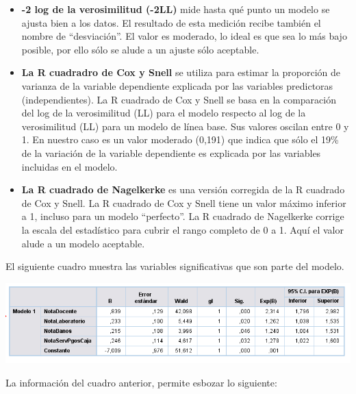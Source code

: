 \documentclass[]{book}
\begin{document}
\begin{itemize}
\item
  \textbf{-2 log de la verosimilitud (-2LL)} mide hasta qué punto un
  modelo se ajusta bien a los datos. El resultado de esta medición
  recibe también el nombre de ``desviación''. El valor es moderado, lo
  ideal es que sea lo más bajo posible, por ello sólo se alude a un
  ajuste sólo aceptable.
\item
  \textbf{La R cuadradro de Cox y Snell} se utiliza para estimar la
  proporción de varianza de la variable dependiente explicada por las
  variables predictoras (independientes). La R cuadrado de Cox y Snell
  se basa en la comparación del log de la verosimilitud (LL) para el
  modelo respecto al log de la verosimilitud (LL) para un modelo de
  línea base. Sus valores oscilan entre 0 y 1. En nuestro caso es un
  valor moderado (0,191) que indica que sólo el 19\% de la variación de
  la variable dependiente es explicada por las variables incluidas en el
  modelo.
\item
  \textbf{La R cuadrado de Nagelkerke} es una versión corregida de la R
  cuadrado de Cox y Snell. La R cuadrado de Cox y Snell tiene un valor
  máximo inferior a 1, incluso para un modelo ``perfecto''. La R
  cuadrado de Nagelkerke corrige la escala del estadístico para cubrir
  el rango completo de 0 a 1. Aquí el valor alude a un modelo aceptable.
\end{itemize}

El siguiente cuadro muestra las variables significativas que son parte
del modelo.

\begin{center}\includegraphics{images/Modelo1} \end{center}

La información del cuadro anterior, permite esbozar lo siguiente:
\end{document}
